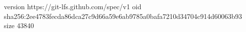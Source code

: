 version https://git-lfs.github.com/spec/v1
oid sha256:2ee4783fecda86dca27c9d66a59e6ab9785a0bafa7210d34704c914d60063b93
size 43840
